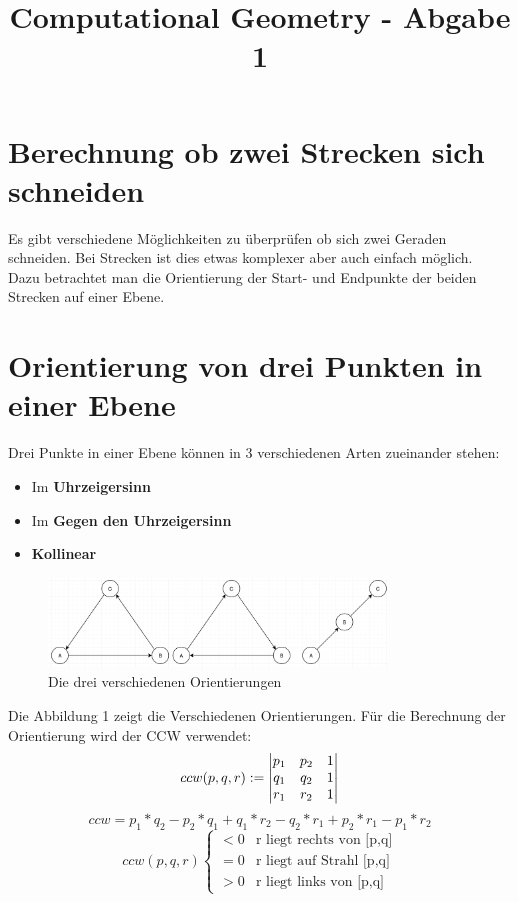 \documentclass[conference]{IEEEtran}
\begin{document}
\title{Computational Geometry - Abgabe 1}

\author{
}

\maketitle


\section{Berechnung ob zwei Strecken sich schneiden}
Es gibt verschiedene Möglichkeiten zu überprüfen ob sich zwei Geraden schneiden. Bei Strecken ist dies etwas komplexer aber auch einfach möglich.\\
Dazu betrachtet man die Orientierung der Start- und Endpunkte der beiden Strecken auf einer Ebene. 
\section{Orientierung von drei Punkten in einer Ebene}
Drei Punkte in einer Ebene können in 3 verschiedenen Arten zueinander stehen:
\begin{itemize}
	\item Im \textbf{Uhrzeigersinn}
	\item Im \textbf{Gegen den Uhrzeigersinn}
	\item \textbf{Kollinear}
\end{itemize}
\begin{figure}[h]
	\begin{center}
		\includegraphics[width=9cm]{Orientation.png}
		\caption{Die drei verschiedenen Orientierungen}
		\label{figure_3}
	\end{center}
\end{figure}
Die Abbildung 1 zeigt die Verschiedenen Orientierungen. Für die Berechnung der Orientierung wird der CCW verwendet:
\[ 
ccw(p,q,r) := 
\begin{vmatrix}
	p_1 & p_2 & 1 \\ 
	q_1 & q_2 & 1 \\ 
	r_1 & r_2 & 1 \notag
\end{vmatrix} \]
\[ ccw = p_1*q_2 - p_2*q_1 + q_1*r_2 - q_2*r_1 + p_2*r_1 - p_1*r_2\]
\[ ccw(p,q,r) \begin{cases} < 0 &\text{r liegt rechts von [p,q]}\\ = 0 &\text{r liegt auf Strahl [p,q]}\\ > 0 &\text{r liegt links von [p,q]}\end{cases} \]
\end{document}

